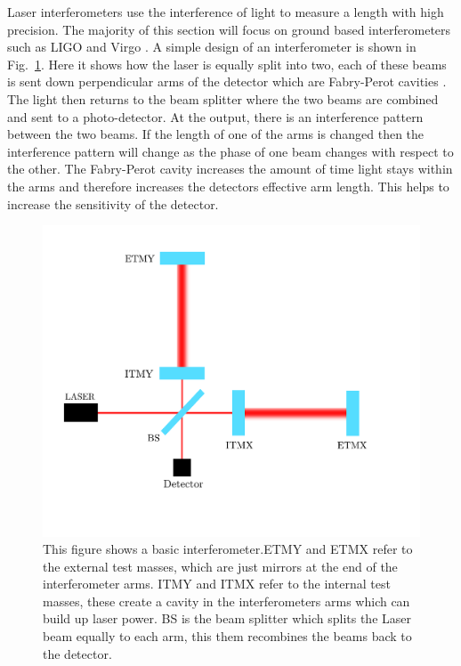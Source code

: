 Laser interferometers use the interference of light to measure a length with high precision.
The majority of this section will focus on ground based interferometers such as \ac{LIGO} and Virgo \citep{Aasi2015,Acernese2015}.
A simple design of an interferometer is shown in Fig.~\ref{detectors:interferometer}. 
Here it shows how the laser is equally split into two, each of these beams is sent down perpendicular arms of the detector which are Fabry-Perot cavities \citep{}. 
The light then returns to the beam splitter where the two beams are combined and sent to a photo-detector.
At the output, there is an interference pattern between the two beams.
If the length of one of the arms is changed then the interference pattern will change as the phase of one beam changes with respect to the other.
The Fabry-Perot cavity increases the amount of time light stays within the arms and therefore increases the detectors effective arm length. This helps to increase the sensitivity of the detector.
\begin{figure}[h]
    \centering
    \includegraphics[width=\textwidth]{C1_Introduction/interferometer.pdf}
    \caption{This figure shows a basic interferometer.ETMY and ETMX refer to the external test masses, which are just mirrors at the end of the interferometer arms. ITMY and ITMX refer to the internal test masses, these create a cavity in the interferometers arms which can build up laser power. BS is the beam splitter which splits the Laser beam equally to each arm, this them recombines the beams back to the detector.}
    \label{detectors:interferometer}
\end{figure}

